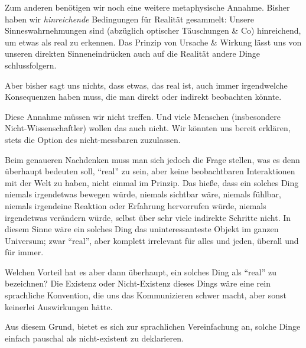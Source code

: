 Zum anderen benötigen wir noch eine weitere metaphysische Annahme. Bisher haben wir \emph{hinreichende} Bedingungen für Realität gesammelt: Unsere Sinneswahrnehmungen sind (abzüglich optischer Täuschungen \& Co) hinreichend, um etwas als real zu erkennen. Das Prinzip von Ursache \& Wirkung lässt uns von unseren direkten Sinneneindrücken auch auf die Realität andere Dinge schlussfolgern.

Aber bisher sagt uns nichts, dass etwas, das real ist, auch immer irgendwelche Konsequenzen haben muss, die man direkt oder indirekt beobachten könnte.

Diese Annahme müssen wir nicht treffen. Und viele Menschen (insbesondere Nicht-Wissenschaftler) wollen das auch nicht. Wir könnten uns bereit erklären, stets die Option des nicht-messbaren zuzulassen.

Beim genaueren Nachdenken muss man sich jedoch die Frage stellen, was es denn überhaupt bedeuten soll, \enquote{real} zu sein, aber keine beobachtbaren Interaktionen mit der Welt zu haben, nicht einmal im Prinzip. Das hieße, dass ein solches Ding niemals irgendetwas bewegen würde, niemals sichtbar wäre, niemals fühlbar, niemals irgendeine Reaktion oder Erfahrung hervorrufen würde, niemals irgendetwas verändern würde, selbst über sehr viele indirekte Schritte nicht. In diesem Sinne wäre ein solches Ding das uninteressanteste Objekt im ganzen Universum; zwar \enquote{real}, aber komplett irrelevant für alles und jeden, überall und für immer.

Welchen Vorteil hat es aber dann überhaupt, ein solches Ding als \enquote{real} zu bezeichnen? Die Existenz oder Nicht-Existenz dieses Dings wäre eine rein sprachliche Konvention, die uns das Kommunizieren schwer macht, aber sonst keinerlei Auswirkungen hätte.

Aus diesem Grund, bietet es sich zur sprachlichen Vereinfachung an, solche Dinge einfach pauschal als nicht-existent zu deklarieren.